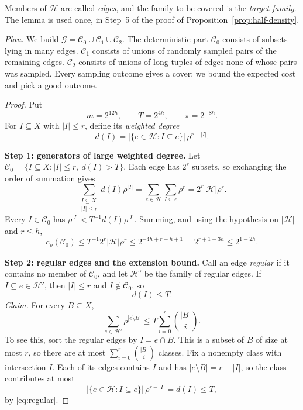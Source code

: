 \documentclass[11pt,letterpaper]{article}
\theoremstyle{definition}
\theoremstyle{remark}
\numberwithin{equation}{section}
\begin{document}
Members of $\mathcal H$ are called \emph{edges}, and the family to be covered is the \emph{target family}. The lemma is used once, in Step~5 of the proof of Proposition~\ref{prop:half-density}.

\emph{Plan.} We build $\mathcal G=\mathcal C_0\cup\mathcal C_1\cup\mathcal C_2$. The deterministic part $\mathcal C_0$ consists of subsets lying in many edges. $\mathcal C_1$ consists of unions of randomly sampled pairs of the remaining edges. $\mathcal C_2$ consists of unions of long tuples of edges none of whose pairs was sampled. Every sampling outcome gives a cover; we bound the expected cost and pick a good outcome.

\begin{proof}
Put
\[
m=2^{12h},\qquad T=2^{4h},\qquad \pi=2^{-8h}.
\]
For \(I\subseteq X\) with \(|I|\le r\), define its \emph{weighted degree}
\[
d(I)=|\{e\in\mathcal H:I\subseteq e\}|\,\rho^{r-|I|}.
\]

\medskip\noindent\textbf{Step 1: generators of large weighted degree.}
Let $\mathcal C_0=\{I\subseteq X:|I|\le r,\ d(I)>T\}$. Each edge has $2^r$ subsets, so exchanging the order of summation gives
\[
\sum_{\substack{I\subseteq X\\|I|\le r}}d(I)\rho^{|I|}
=\sum_{e\in\mathcal H}\sum_{I\subseteq e}\rho^{r}
=2^r|\mathcal H|\rho^r.
\]
Every $I\in\mathcal C_0$ has $\rho^{|I|}<T^{-1}d(I)\rho^{|I|}$. Summing, and using the hypothesis on $|\mathcal H|$ and $r\le h$,
\begin{equation}\label{eq:covering-initial-cost}
c_\rho(\mathcal C_0)
\le T^{-1}2^r|\mathcal H|\rho^r
\le2^{-4h+r+h+1}=2^{r+1-3h}\le2^{1-2h}.
\end{equation}

\medskip\noindent\textbf{Step 2: regular edges and the extension bound.}
Call an edge \emph{regular} if it contains no member of $\mathcal C_0$, and let $\mathcal H'$ be the family of regular edges. If $I\subseteq e\in\mathcal H'$, then $|I|\le r$ and $I\notin\mathcal C_0$, so
\begin{equation}\label{eq:regular}
d(I)\le T.
\end{equation}
\emph{Claim.} For every $B\subseteq X$,
\begin{equation}\label{eq:covering-extension}
\sum_{e\in\mathcal H'}\rho^{|e\setminus B|}
\le T\sum_{i=0}^r\binom{|B|}{i}.
\end{equation}
To see this, sort the regular edges by $I=e\cap B$. This is a subset of $B$ of size at most $r$, so there are at most $\sum_{i=0}^r\binom{|B|}{i}$ classes. Fix a nonempty class with intersection $I$. Each of its edges contains $I$ and has $|e\setminus B|=r-|I|$, so the class contributes at most
\[
|\{e\in\mathcal H:I\subseteq e\}|\,\rho^{r-|I|}=d(I)\le T,
\]
by \eqref{eq:regular}.


\end{proof}
\end{document}
